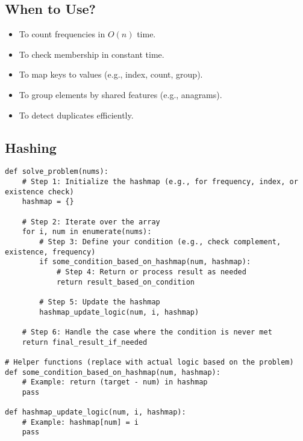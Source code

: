 \subsection{When to Use?}
\begin{summary}
    \begin{itemize}
        \item To count frequencies in \( O(n) \) time.
        \item To check membership in constant time.
        \item To map keys to values (e.g., index, count, group).
        \item To group elements by shared features (e.g., anagrams).
        \item To detect duplicates efficiently.
    \end{itemize}
\end{summary}

\subsection{Hashing}
\begin{algo}
\begin{lstlisting}
def solve_problem(nums):
    # Step 1: Initialize the hashmap (e.g., for frequency, index, or existence check)
    hashmap = {}

    # Step 2: Iterate over the array
    for i, num in enumerate(nums):
        # Step 3: Define your condition (e.g., check complement, existence, frequency)
        if some_condition_based_on_hashmap(num, hashmap):
            # Step 4: Return or process result as needed
            return result_based_on_condition
        
        # Step 5: Update the hashmap
        hashmap_update_logic(num, i, hashmap)

    # Step 6: Handle the case where the condition is never met
    return final_result_if_needed

# Helper functions (replace with actual logic based on the problem)
def some_condition_based_on_hashmap(num, hashmap):
    # Example: return (target - num) in hashmap
    pass

def hashmap_update_logic(num, i, hashmap):
    # Example: hashmap[num] = i
    pass
\end{lstlisting}
\end{algo}
\newpage

